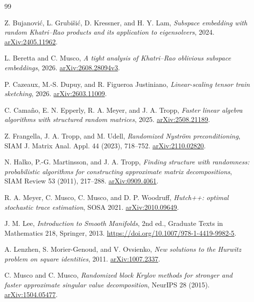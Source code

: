 \documentclass[11pt,a4paper]{article}
\theoremstyle{definition}
\theoremstyle{remark}
\numberwithin{equation}{section}
\begin{document}
\begin{thebibliography}{99}
\setlength{\itemsep}{3pt}\setlength{\parsep}{0pt}\setlength{\parskip}{0pt}

Z. Bujanovi\'c, L. Grubi\v{s}i\'c, D. Kressner, and H. Y. Lam,
\emph{Subspace embedding with random Khatri--Rao products and its application
to eigensolvers}, 2024. \href{https://arxiv.org/abs/2405.11962}{arXiv:2405.11962}.

L. Beretta and C. Musco,
\emph{A tight analysis of Khatri--Rao oblivious subspace embeddings}, 2026.
\href{https://arxiv.org/abs/2608.28094v3}{arXiv:2608.28094v3}.

P. Cazeaux, M.-S. Dupuy, and R. Figueroa Justiniano,
\emph{Linear-scaling tensor train sketching}, 2026. \href{https://arxiv.org/abs/2603.11009}{arXiv:2603.11009}.

C. Cama\~no, E. N. Epperly, R. A. Meyer, and J. A. Tropp,
\emph{Faster linear algebra algorithms with structured random matrices}, 2025.
\href{https://arxiv.org/abs/2508.21189}{arXiv:2508.21189}.

Z. Frangella, J. A. Tropp, and M. Udell,
\emph{Randomized Nystr\"om preconditioning}, SIAM J. Matrix Anal. Appl. 44
(2023), 718--752. \href{https://arxiv.org/abs/2110.02820}{arXiv:2110.02820}.

N. Halko, P.-G. Martinsson, and J. A. Tropp,
\emph{Finding structure with randomness: probabilistic algorithms for
constructing approximate matrix decompositions}, SIAM Review 53 (2011),
217--288. \href{https://arxiv.org/abs/0909.4061}{arXiv:0909.4061}.

R. A. Meyer, C. Musco, C. Musco, and D. P. Woodruff,
\emph{Hutch++: optimal stochastic trace estimation}, SOSA 2021.
\href{https://arxiv.org/abs/2010.09649}{arXiv:2010.09649}.

J. M. Lee, \emph{Introduction to Smooth Manifolds}, 2nd ed., Graduate Texts in
Mathematics 218, Springer, 2013.
\url{https://doi.org/10.1007/978-1-4419-9982-5}.

A. Lenzhen, S. Morier-Genoud, and V. Ovsienko,
\emph{New solutions to the Hurwitz problem on square identities}, 2011.
\href{https://arxiv.org/abs/1007.2337}{arXiv:1007.2337}.

C. Musco and C. Musco,
\emph{Randomized block Krylov methods for stronger and faster approximate
singular value decomposition}, NeurIPS 28 (2015).
\href{https://arxiv.org/abs/1504.05477}{arXiv:1504.05477}.


\end{thebibliography}
\end{document}
